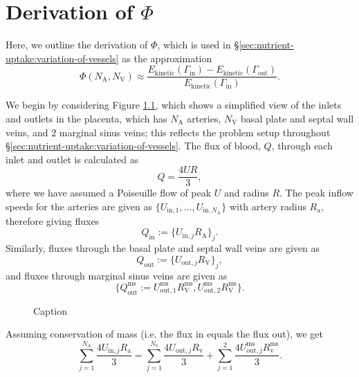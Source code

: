 \chapter{Derivation of \texorpdfstring{$\Phi$}{Φ}} \label{sec:analytical-energy}
    
    Here, we outline the derivation of $\Phi$, which is used in \S\ref{sec:nutrient-uptake:variation-of-vessels} as the approximation
    \begin{equation*}
        \Phi(N_\text{A}, N_\text{V}) \approx \frac{E_\text{kinetic}(\Gamma_\text{in}) - E_\text{kinetic}(\Gamma_\text{out})}{E_\text{kinetic}(\Gamma_\text{in})}.
    \end{equation*}

    We begin by considering Figure \ref{fig:analytical-expression-placenta}, which shows a simplified view of the inlets and outlets in the placenta, which has $N_\text{A}$ arteries, $N_\text{V}$ basal plate and septal wall veins, and $2$ marginal sinus veins; this reflects the problem setup throughout \S\ref{sec:nutrient-uptake:variation-of-vessels}. The flux of blood, $Q$, through each inlet and outlet is calculated as
    \begin{equation}
        Q = \frac{4 U R}{3},
    \end{equation}
    where we have assumed a Poiseuille flow of peak $U$ and radius $R$. The peak inflow speeds for the arteries are given as $\{ U_{\text{in},1}, ..., U_{\text{in},N_\text{A}} \}$ with artery radius $R_\text{a}$, therefore giving fluxes $$Q_\text{in} := \{ U_{\text{in},j} R_\text{A} \}_j.$$ Similarly, fluxes through the basal plate and septal wall veins are given as $$Q_\text{out} := \{ U_{\text{out},j} R_\text{V} \}_j,$$ and fluxes through marginal sinus veins are given as $$\{ Q^\text{ms}_\text{out} := U^\text{ms}_{\text{out},1} R^\text{ms}_\text{V}, U^\text{ms}_{\text{out},2} R^\text{ms}_\text{V} \}.$$
    
    \begin{figure}
        \centering
        
        \caption{Caption}
        \label{fig:analytical-expression-placenta}
    \end{figure}

    Assuming conservation of mass (i.e. the flux in equals the flux out), we get
    \begin{equation}
        \sum_{j=1}^{N_\text{A}} \frac{4 U_{\text{in},j} R_\text{a}}{3} = \sum_{j=1}^{N_\text{v}} \frac{4 U_{\text{out},j} R_\text{v}}{3} + \sum_{j=1}^{2} \frac{4 U^\text{ms}_{\text{out},j} R^\text{ms}_\text{v}}{3}.
        \label{eq:analytical-expression-conservation-of-mass}
    \end{equation}

